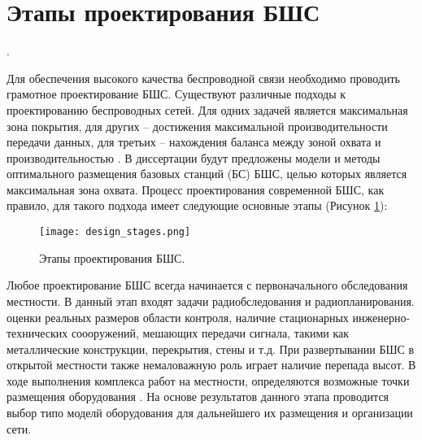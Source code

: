 

\section{Этапы проектирования БШС}.


Для обеспечения высокого качества беспроводной связи необходимо проводить грамотное проектирование БШС. Существуют различные подходы к проектированию беспроводных сетей. Для одних задачей является максимальная зона покрытия, для других -- достижения максимальной производительности передачи данных, для третьих -- нахождения баланса между зоной охвата и производительностью \cite{Proletarsky}. В диссертации будут предложены модели и методы оптимального размещения базовых станций (БС) БШС, целью которых является максимальная зона охвата.  Процесс проектирования современной БШС, как правило, для такого подхода имеет следующие основные этапы (Рисунок \cref{fig:part1_design_stages}):

\begin{figure}[h!]
  \centering
   \texttt{[image: design\_stages.png]}
\caption{Этапы проектирования БШС.}
\label{fig:part1_design_stages}
\end{figure}

Любое проектирование БШС всегда начинается с первоначального обследования местности. В данный этап входят задачи радиобследования и радиопланирования. оценки реальных размеров области контроля, наличие стационарных инженерно-технических соооружений, мешающих передачи сигнала, такими как металлические конструкции, перекрытия, стены и т.д. При развертывании БШС в открытой местности также немаловажную роль играет наличие перепада высот. В ходе выполнения комплекса работ на местности, определяются возможные точки размещения оборудования \cite{Dunaitsev2017}. На основе результатов данного этапа проводится выбор типо моделй оборудования для дальнейшего их размещения и организации сети.

